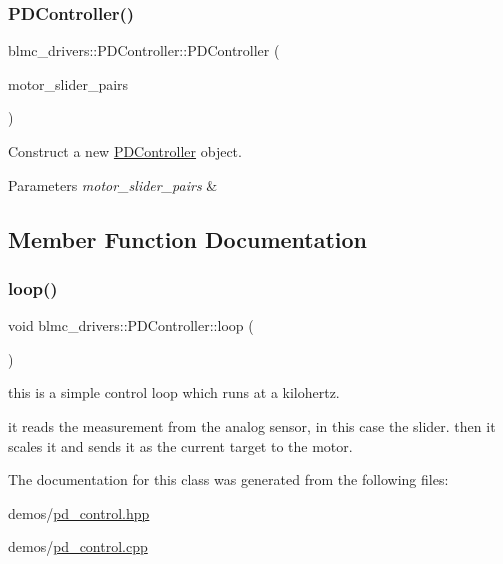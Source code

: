 \subsubsection{\texorpdfstring{P\+D\+Controller()}{PDController()}}
{\footnotesize\ttfamily blmc\+\_\+drivers\+::\+P\+D\+Controller\+::\+P\+D\+Controller (\begin{DoxyParamCaption}\item[{std\+::vector$<$ \hyperlink{namespaceblmc__drivers_a134270c90d29a9a28b64ab0e5f7158f7}{Pair\+Motor\+Slider} $>$}]{motor\+\_\+slider\+\_\+pairs }\end{DoxyParamCaption})\hspace{0.3cm}{\ttfamily [inline]}}



Construct a new \hyperlink{classblmc__drivers_1_1PDController}{P\+D\+Controller} object. 


\begin{DoxyParams}{Parameters}
{\em motor\+\_\+slider\+\_\+pairs} & \\
\hline
\end{DoxyParams}


\subsection{Member Function Documentation}
\mbox{\label{classblmc__drivers_1_1PDController_ae00d08095b9ff6b6dfd550c59ba2857a}} 
\subsubsection{\texorpdfstring{loop()}{loop()}}
{\footnotesize\ttfamily void blmc\+\_\+drivers\+::\+P\+D\+Controller\+::loop (\begin{DoxyParamCaption}{ }\end{DoxyParamCaption})\hspace{0.3cm}{\ttfamily [private]}}



this is a simple control loop which runs at a kilohertz. 

it reads the measurement from the analog sensor, in this case the slider. then it scales it and sends it as the current target to the motor. 

The documentation for this class was generated from the following files\+:\begin{DoxyCompactItemize}
\item 
demos/\hyperlink{pd__control_8hpp}{pd\+\_\+control.\+hpp}\item 
demos/\hyperlink{pd__control_8cpp}{pd\+\_\+control.\+cpp}\end{DoxyCompactItemize}
